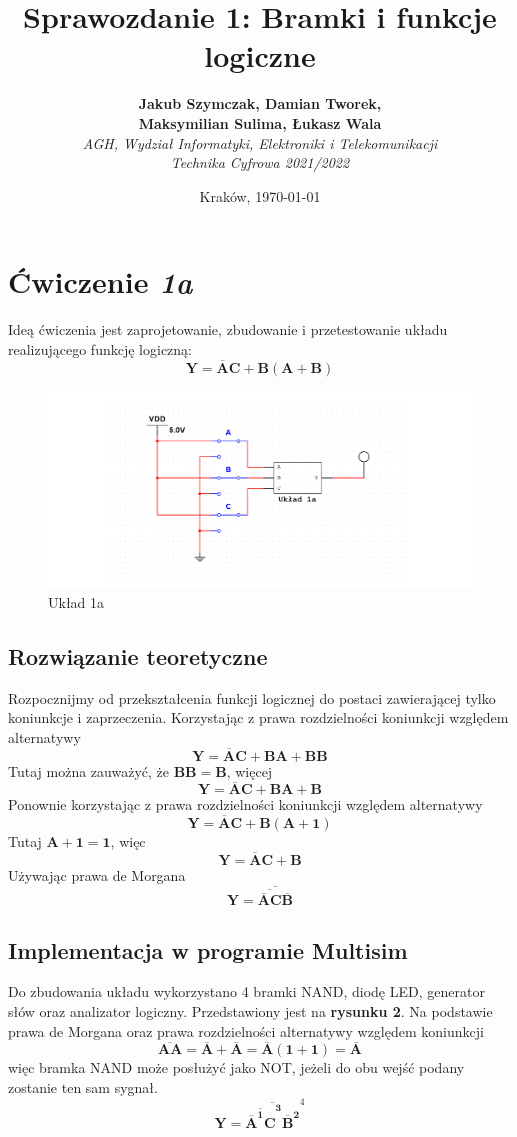 \documentclass{article}
\title{Sprawozdanie 1: Bramki i funkcje logiczne}
\author{\textbf{Jakub Szymczak, Damian Tworek,}\\ \textbf{Maksymilian Sulima, Łukasz Wala} \\
    \textit{AGH, Wydział Informatyki, Elektroniki i Telekomunikacji} \\
    \textit{Technika Cyfrowa 2021/2022}}
\date{Kraków, \today}
\begin{document}
\maketitle



\section{Ćwiczenie \textit{1a}}
Ideą ćwiczenia jest zaprojetowanie, zbudowanie i przetestowanie układu realizującego funkcję logiczną:
\[\mathbf{Y=\overline{A}C+B(A+B)}\]

\begin{figure}[H]
    \centering
    \includegraphics[width=\textwidth]{idea_1.png}
    \caption{Układ 1a}
\end{figure}

\subsection{Rozwiązanie teoretyczne}
Rozpocznijmy od przekształcenia funkcji logicznej do postaci zawierającej tylko koniunkcje i zaprzeczenia. 
Korzystając z prawa rozdzielności koniunkcji względem alternatywy
\[\mathbf{Y=\overline{A}C+BA+BB}\]
Tutaj można zauważyć, że $\mathbf{BB=B}$, więcej
\[\mathbf{Y=\overline{A}C+BA+B}\]
Ponownie korzystając z prawa rozdzielności koniunkcji względem alternatywy
\[\mathbf{Y=\overline{A}C+B(A+1)}\]
Tutaj $\mathbf{A+1=1}$, więc
\[\mathbf{Y=\overline{A}C+B}\]
Używając prawa de Morgana
\[\mathbf{Y=\overline{\overline{\overline{A}C}\overline{B}}}\]

\subsection{Implementacja w programie Multisim}
Do zbudowania układu wykorzystano 4 bramki NAND, diodę LED, generator słów oraz analizator logiczny.
Przedstawiony jest na \textbf{rysunku 2}.
Na podstawie prawa de Morgana oraz prawa rozdzielności alternatywy względem koniunkcji
\[\mathbf{\overline{AA}=\overline{A}+\overline{A}=\overline{A}(1+1)=\overline{A}}\]
więc bramka NAND może posłużyć jako NOT, jeżeli do obu wejść podany zostanie ten sam sygnał.
\[\mathbf{Y=\overline{\overline{\overline{A}^1C}^3\overline{B}^2}}^4\]
\end{document}
